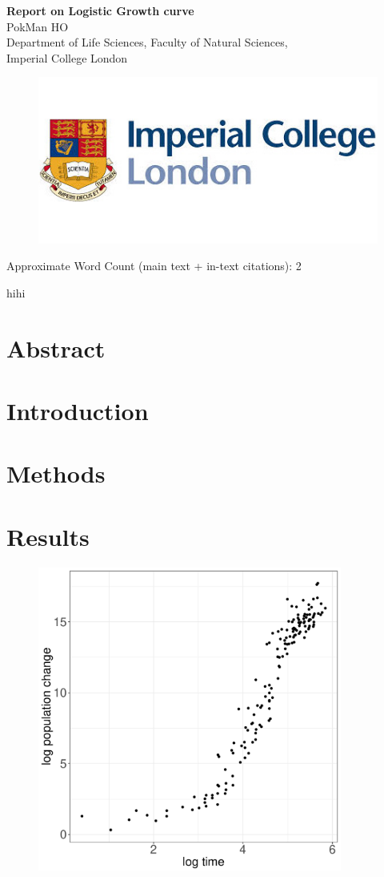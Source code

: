 \documentclass[a4paper, 11pt]{article}
\title{\ReportTitle}
\author{\ReportAuthor (CID: 01786076)}
\date{}
\newcommand{\ReportTitle}{Report on Logistic Growth curve} %
\newcommand{\ReportAuthor}{PokMan HO}
\newcommand{\ReportAffil}{Department of Life Sciences, Faculty of Natural Sciences,\\Imperial College London}
\begin{document}
	\begin{center}
		\Huge\textbf{\ReportTitle}\\
		\LARGE\ReportAuthor\\
		\Large\ReportAffil
	\end{center}
	\begin{figure}[h]
		\centering\includegraphics[width=\linewidth]{icl.jpg}
	\end{figure}
	\begin{flushright}
		\Large Approximate Word Count (main text + in-text citations): 
2
	\end{flushright}
	\clearpage
	
	\maketitle
	hihi\autocite{zwietering1994modeling}
	\section*{Abstract}
	\section*{Introduction}
	\section*{Methods}
	\section*{Results}
	\begin{figure}[h]
		\centering\includegraphics[width=10cm]{Log_data.pdf}
	\end{figure}
\end{document}
